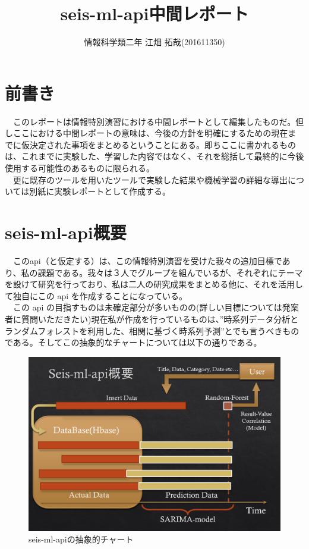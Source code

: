 \documentclass{scrartcl}
\author{情報科学類二年 江畑 拓哉(201611350)}
\date{}
\title{seis-ml-api中間レポート}
\begin{document}
\maketitle
\tableofcontents


\section{前書き}
\label{sec:org274100e}
　このレポートは情報特別演習における中間レポートとして編集したものだ。但しここにおける中間レポートの意味は、今後の方針を明確にするための現在までに仮決定された事項をまとめるということにある。即ちここに書かれるものは、これまでに実験した、学習した内容ではなく、それを総括して最終的に今後使用する可能性のあるものに限られる。\\
　更に既存のツールを用いたツールで実験した結果や機械学習の詳細な導出については別紙に実験レポートとして作成する。\\

\section{seis-ml-api概要}
\label{sec:org6b3bb48}
　このapi（と仮定する）は、この情報特別演習を受けた我々の追加目標であり、私の課題である。我々は３人でグループを組んでいるが、それぞれにテーマを設けて研究を行っており、私は二人の研究成果をまとめる他に、それを活用して独自にこの api を作成することになっている。\\
　この api の目指すものは未確定部分が多いものの(詳しい目標については発案者に質問いただきたい)現在私が作成を行っているものは、”時系列データ分析とランダムフォレストを利用した、相関に基づく時系列予測”とでも言うべきものである。そしてこの抽象的なチャートについては以下の通りである。\\
\begin{figure}[htbp]
\centering
\includegraphics[width=15cm]{./idea-1.png}
\caption{seis-ml-apiの抽象的チャート}
\end{figure}
\end{document}
